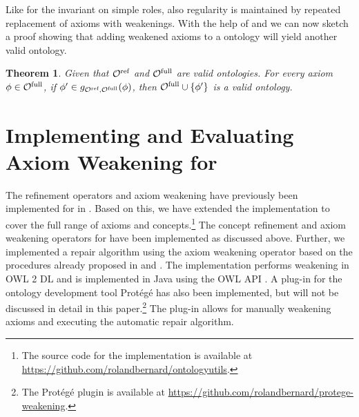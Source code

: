 \documentclass[
]{ceurart}
\newtheorem{theorem}{Theorem}
\begin{document}
Like for the invariant on simple roles, also regularity is maintained by repeated replacement of axioms with weakenings. With the help of  and  we can now sketch a proof showing that adding weakened axioms to a \SROIQ ontology will yield another valid \SROIQ ontology.

\begin{theorem} \label{lem:global-constraints}
  Given that ${\mathcal{O}^\textnormal{ref}}$ and ${\mathcal{O}^\textnormal{full}}$ are valid \SROIQ ontologies. For every axiom $\phi \in {\mathcal{O}^\textnormal{full}}$, if $\phi' \in g_{{\mathcal{O}^\textnormal{ref}},{\mathcal{O}^\textnormal{full}}}(\phi)$, then ${\mathcal{O}^\textnormal{full}} \cup \{ \phi' \}$ is a valid \SROIQ ontology.
\end{theorem}


\section{Implementing and Evaluating Axiom Weakening for \SROIQ}

The refinement operators and axiom weakening have previously been implemented for \ALC in \cite{troquard2018repairing}. Based on this, we have extended the implementation to cover the full range of \SROIQ axioms and concepts.\footnote{The source code for the implementation is available at \url{https://github.com/rolandbernard/ontologyutils}.} The concept refinement and axiom weakening operators for \SROIQ have been implemented as discussed above. Further, we implemented a repair algorithm using the axiom weakening operator based on the procedures already proposed in \cite{troquard2018repairing} and \cite{confalonieri2020towards}. The implementation performs weakening in OWL 2 DL \cite{motik2012ontology} and is implemented in Java using the OWL API \cite{horridge2011owl}. A plug-in for the ontology development tool Protégé has also been implemented, but will not be discussed in detail in this paper.\footnote{The Protégé plugin is available at \url{https://github.com/rolandbernard/protege-weakening}.} The plug-in allows for manually weakening axioms and executing the automatic repair algorithm.
\end{document}
